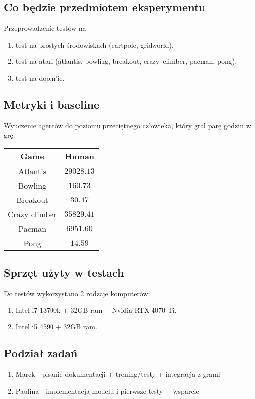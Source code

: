   \subsection{Co będzie przedmiotem eksperymentu}
    Przeprowadzenie testów na 
    \begin{enumerate}
      \item test na prostych środowiskach (cartpole, gridworld),
      \item test na atari (atlantis, bowling, breakout, crazy~climber, pacman, pong),
      \item test na doom'ie.
    \end{enumerate}

  \subsection{Metryki i baseline}
    
      
        Wyuczenie agentów do poziomu przeciętnego człowieka, który grał parę godzin w grę.  
     
        \begin{tabular}[H]{||c c||} 
        \hline
        Game & Human \\ [0.5ex] 
        \hline\hline
        Atlantis & $29028.13$ \\ 
        \hline
        Bowling & $160.73$  \\
        \hline
        Breakout & $30.47$ \\
        \hline
        Crazy climber & $35829.41$  \\
        \hline
        Pacman & $6951.60$  \\
        \hline
        Pong & $14.59$  \\ [1ex] 
        \hline
        \end{tabular}

  \subsection{Sprzęt użyty w testach}
    Do testów wykorzystano 2 rodzaje komputerów:
    \begin{enumerate}
      \item Intel i7 13700k + 32GB ram + Nvidia RTX 4070 Ti,
      \item Intel i5 4590 + 32GB ram.
    \end{enumerate}  

  \subsection{Podział zadań}
    \begin{enumerate}
      \item Marek - pisanie dokumentacji + trening/testy + integracja z grami
      \item Paulina - implementacja modelu i pierwsze testy + wsparcie
    \end{enumerate}
